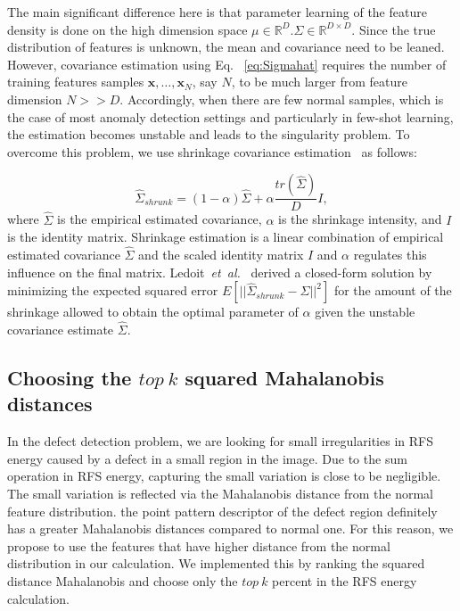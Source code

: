 \documentclass[journal]{IEEEtran}
\newcommand \andothers {\textit{et~al.}}
\begin{document}
The main significant difference here is that parameter learning of the feature density is done on the high dimension space $\mu\in \mathbb{R}^D.\Sigma \in \mathbb{R}^{D\times D}$. Since the true distribution of features is unknown, the mean and covariance need to be leaned. However, covariance estimation using Eq. ~\ref{eq:Sigmahat} requires the number of  training features samples $\mathbf{x},\ldots,\mathbf{x}_N$, say $N$, to be much larger from feature dimension $N>>D$. Accordingly, when there are few normal samples, which is the case of most anomaly detection settings and particularly in few-shot learning, the estimation becomes unstable and leads to the singularity problem. To overcome this problem, we use shrinkage covariance estimation~\cite{ledoit2004well} as follows:

\begin{equation}
\hat{\Sigma}_{shrunk}=(1-\alpha)\hat{\Sigma}+\alpha\frac{tr(\hat{\Sigma})}{D} I,
\label{eq:Sigma_shrunk}
\end{equation}
where $\hat{\Sigma}$ is the empirical estimated covariance, $\alpha$ is the shrinkage intensity, and $I$ is the identity matrix. Shrinkage estimation is a linear combination of empirical estimated covariance $\hat{\Sigma}$ and the scaled identity matrix $I$ and $\alpha$ regulates this influence on the final matrix. Ledoit~\andothers~\cite{ledoit2004well} derived a closed-form solution by minimizing the expected squared error $E[||\hat{\Sigma}_{shrunk}-\Sigma||^2]$ for the amount of the shrinkage allowed to obtain the optimal parameter of $\alpha$ given the unstable covariance estimate $\hat{\Sigma}$.

\subsection{Choosing the $top~k$ squared Mahalanobis distances}
In the defect detection problem, we are looking for small irregularities in RFS energy caused by a defect in a small region in the image. Due to the sum operation in RFS energy, capturing the small variation is close to be negligible. The small variation is reflected via the Mahalanobis distance from the normal feature distribution. the point pattern descriptor of the defect region definitely has a greater Mahalanobis distances compared to normal one. For this reason, we propose to use the features that have higher distance from the normal distribution in our calculation. We implemented this by ranking the squared distance Mahalanobis and choose only the $top~k$ percent in the RFS energy calculation.
\end{document}

